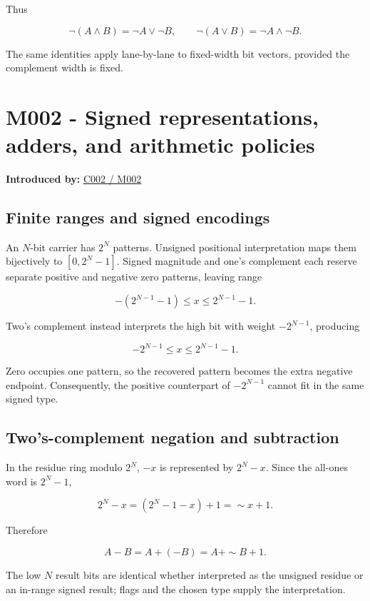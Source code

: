 Thus

\[
\neg(A\land B)=\neg A\lor\neg B,
\qquad
\neg(A\lor B)=\neg A\land\neg B.
\]

The same identities apply lane-by-lane to fixed-width bit vectors, provided the complement width is fixed.

\section{M002 - Signed representations, adders, and arithmetic policies}\label{01-foundations-i-ch011-m002---signed-representations-adders-and-arithmetic-policies}

\textbf{Introduced by:} \hyperref[01-foundations-i-ch001-arithmetic-becomes-a-policy]{C002 / M002}

\subsection{Finite ranges and signed encodings}\label{01-foundations-i-ch011-finite-ranges-and-signed-encodings}

An \(N\)-bit carrier has \(2^N\) patterns. Unsigned positional interpretation maps them bijectively to \([0,2^N-1]\). Signed magnitude and one's complement each reserve separate positive and negative zero patterns, leaving range

\[
-(2^{N-1}-1)\le x\le2^{N-1}-1.
\]

Two's complement instead interprets the high bit with weight \(-2^{N-1}\), producing

\[
-2^{N-1}\le x\le2^{N-1}-1.
\]

Zero occupies one pattern, so the recovered pattern becomes the extra negative endpoint. Consequently, the positive counterpart of \(-2^{N-1}\) cannot fit in the same signed type.

\subsection{Two's-complement negation and subtraction}\label{01-foundations-i-ch011-twos-complement-negation-and-subtraction}

In the residue ring modulo \(2^N\), \(-x\) is represented by \(2^N-x\). Since the all-ones word is \(2^N-1\),

\[
2^N-x=(2^N-1-x)+1=\sim x+1.
\]

Therefore

\[
A-B=A+(-B)=A+\sim B+1.
\]

The low \(N\) result bits are identical whether interpreted as the unsigned residue or an in-range signed result; flags and the chosen type supply the interpretation.

